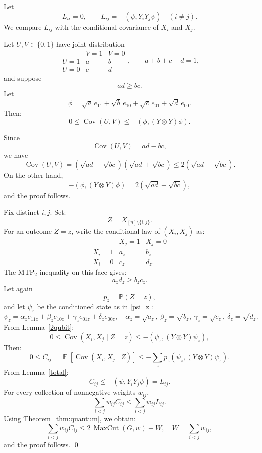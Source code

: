 \documentclass[12pt,reqno]{amsart}
\makeatletter
\renewenvironment{proof}[1][\proofname]{%
  \par\vspace{\topsep}%
  \normalfont\topsep6\p@\@plus6\p@\relax
  \trivlist
  \item[\hskip\labelsep\itshape #1\@addpunct{.}]\ignorespaces
}{%
  \endtrivlist
}
\numberwithin{equation}{section}
\DeclareMathOperator{\E}{\mathbb{E}}
\DeclareMathOperator{\Cov}{Cov} \newcommand{\MTP}{\mathrm{MTP}_2}
\makeatother
\begin{document}
Let 
\[ 
L_{ii}=0, \qquad L_{ij}=-(\psi,Y_iY_j\psi) \quad(i\ne j). 
\] 
We compare \(L_{ij}\) with the conditional covariance of
\(X_i\) and \(X_j\).
\begin{lemma}\label{2qubit}
Let \(U,V\in\{0,1\}\) have joint distribution
\[
\begin{array}{c|cc}
 & V=1 & V=0\\ \hline
U=1 & a & b\\
U=0 & c & d
\end{array},
\qquad
a+b+c+d=1,
\]
and suppose
\[
ad\ge bc.
\]
Let
\[
\phi
=
\sqrt a\,e_{11}
+\sqrt b\,e_{10}
+\sqrt c\,e_{01}
+\sqrt d\,e_{00}.
\]
Then:
\[
0\le\Cov(U,V)
\le
-(\phi,(Y\otimes Y)\phi).
\]
\end{lemma}
\begin{proof}
Since
\[
\Cov(U,V)=ad-bc,
\]
we have
\[
\Cov(U,V)
=
(\sqrt{ad}-\sqrt{bc})(\sqrt{ad}+\sqrt{bc})
\le
2(\sqrt{ad}-\sqrt{bc}).
\]
On the other hand,
\[
-(\phi,(Y\otimes Y)\phi)
=
2(\sqrt{ad}-\sqrt{bc}),
\]
and the proof follows.
\end{proof}

\begin{proof}[Proof of Theorem~\ref{thm:main}]
Fix distinct \(i,j\). Set:
\[
Z=X_{[n]\setminus\{i,j\}}.
\]
For an outcome \(Z=z\), write the conditional law of \((X_i,X_j)\) as:
\[
\begin{array}{c|cc}
 & X_j=1 & X_j=0\\ \hline
X_i=1 & a_z & b_z\\
X_i=0 & c_z & d_z.
\end{array}
\]
The \(\MTP\) inequality on this face gives: 
\[ 
a_zd_z\ge b_zc_z. 
\]
Let again
\[
p_z=\mathbb P(Z=z),
\]
and let \(\psi_z\) be the conditioned state as in \eqref{psi_z}:
\[
\psi_z = \alpha_z e_{11z} +\beta_z e_{10z} +\gamma_z e_{01z} +\delta_z e_{00z},\quad 
\alpha_z = \sqrt{a_z},\  
\beta_z = \sqrt{b_z},\ 
\gamma_z = \sqrt{c_z},\ 
\delta_z = \sqrt{d_z}.
\]
From Lemma~\ref{2qubit}:
\[
0 \le 
\Cov(X_i,X_j\mid Z=z) \le 
-(\psi_z,(Y\otimes Y)\psi_z),
\]
Then:
\[
0 \le C_{ij} = \E\!\left[
\Cov(X_i,X_j\mid Z)
\right] \le 
-\sum_zp_z
(\psi_z,(Y\otimes Y)\psi_z).
\]
From Lemma~\ref{total}:
\[
C_{ij} \le -(\psi,Y_iY_j\psi) = L_{ij}.
\]
For every collection of nonnegative weights 
\(w_{ij}\), 
\[ 
\sum_{i<j}w_{ij}C_{ij} \le \sum_{i<j}w_{ij}L_{ij}. 
\] 
Using Theorem~\ref{thm:quantum}, we obtain: 
\[ 
\sum_{i<j}w_{ij}C_{ij} \le 
2\,\operatorname{MaxCut}(G,w)-W,\quad 
W=\sum_{i<j}w_{ij},
\] 
and the proof follows. \qed
\end{proof}
\end{document}
